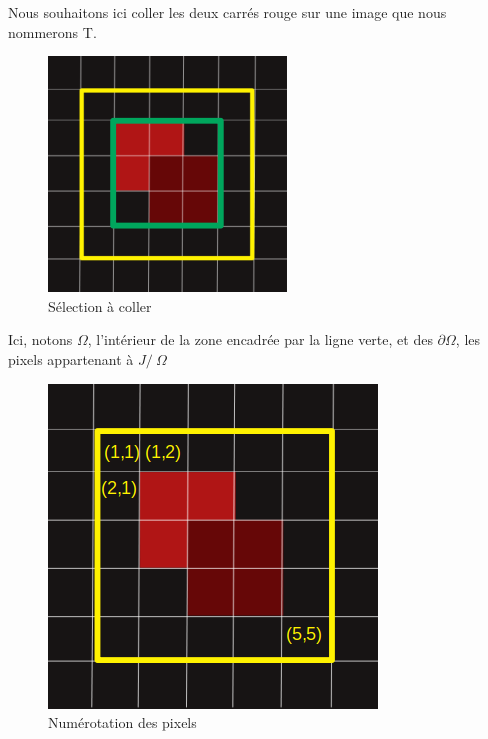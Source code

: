 Nous souhaitons ici coller les deux carrés rouge sur une image que nous nommerons T.   
\begin{figure}[!h]
\centering
\includegraphics[scale=0.3]{Images/carre_selection.png}
\caption{Sélection à coller}
\end{figure}
Ici, notons $\Omega$, l'intérieur de la zone encadrée par la ligne verte, et des $\partial \Omega$, les pixels appartenant à $J /\ \Omega$

\begin{figure}[!h]
\centering
\includegraphics[scale=0.3]{Images/numerote.png}
\caption{Numérotation des pixels}
\end{figure}


